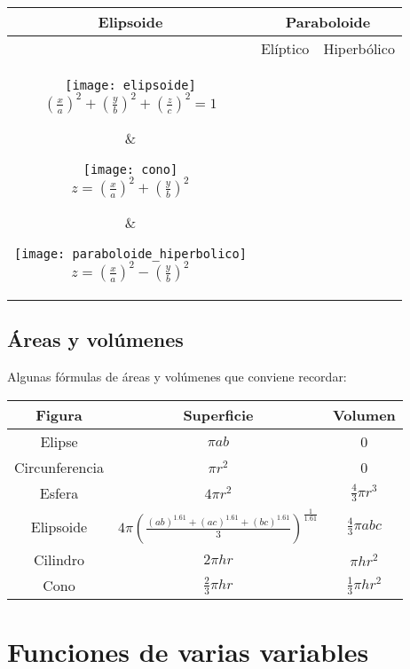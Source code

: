 \documentclass[a4paper, twoside]{article}
\numberwithin{equation}{section}
\numberwithin{figure}{section}
\numberwithin{table}{section}
\begin{document}
\begin{center}
	\begin{tabular}{c | c c}
		\textbf{Elipsoide} & \multicolumn{2}{c}{\textbf{Paraboloide}} \\ 
		\hline
		 & Elíptico & Hiperbólico \\ 
		\parbox{5cm}{
			\begin{center}
				\texttt{[image: elipsoide]} \\
				$\left(\frac{x}{a}\right)^2+\left(\frac{y}{b}\right)^2+\left(\frac{z}{c}\right)^2=1$
			\end{center}} &
		\parbox{5cm}{
			\begin{center}
				\texttt{[image: cono]} \\
				$z=\left(\frac{x}{a}\right)^2+\left(\frac{y}{b}\right)^2$
			\end{center}} &
		\parbox{5cm}{
			\begin{center}
				\texttt{[image: paraboloide\_hiperbolico]} \\
				$z=\left(\frac{x}{a}\right)^2-\left(\frac{y}{b}\right)^2$
			\end{center}} \\
	\end{tabular} 
\end{center}		

\subsection{Áreas y volúmenes}
Algunas fórmulas de áreas y volúmenes que conviene recordar:

\begin{center}
	\begin{tabular}{c c c}
		Figura & Superficie & Volumen \\
		\hline
		Elipse & $\pi ab$ & 0 \\
		Circunferencia & $\pi r^2$ & 0 \\
		Esfera & $4\pi r^2$ & $\frac{4}{3}\pi r^3$ \\
		Elipsoide & $4\pi \left(\frac{(ab)^{1.61}+(ac)^{1.61}+(bc)^{1.61}}{3}\right)^\frac{1}{1.61}$ 
		& $\frac{4}{3}\pi abc$ \\
		Cilindro & $2\pi h r$ & $\pi h r^2$\\
		Cono & $\frac{2}{3}\pi h r$ & $\frac{1}{3}\pi h r^2$ \\					
	\end{tabular} 
\end{center}				

\section{Funciones de varias variables}
\end{document}
